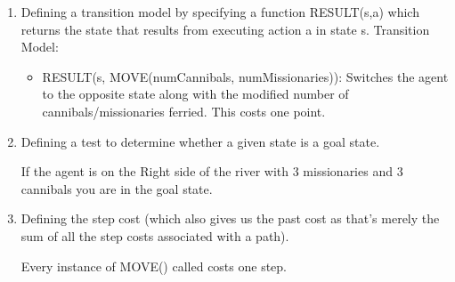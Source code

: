 \documentclass[12pt]{article}
\begin{document}
\begin{enumerate}
\begin{enumerate}
    \item Defining a transition model by specifying a function RESULT(s,a) which returns the state that results from executing action a in state s.
    Transition Model:
      \begin{itemize}
        \item RESULT(s, MOVE(numCannibals, numMissionaries)): Switches the agent to the opposite state along with the modified number of cannibals/missionaries ferried.  This costs one point. 
      \end{itemize}
    \item Defining a test to determine whether a given state is a goal state.\par
    If the agent is on the Right side of the river with 3 missionaries and 3 cannibals you are in the goal state.

    \item Defining the step cost (which also gives us the past cost as that's merely the sum of all the step costs associated with a path).\par
    Every instance of MOVE() called costs one step.
  \end{enumerate}


\end{enumerate}
\end{document}
